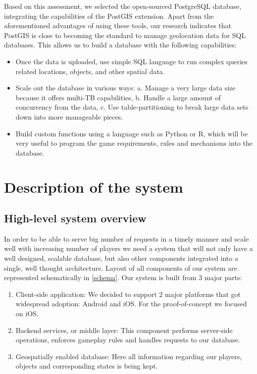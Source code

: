 \documentclass[conference]{IEEEtran}
\begin{document}
Based on this assessment, we selected the open-sourced PostgreSQL database, integrating the capabilities of the PostGIS extension. Apart from the aforementioned advantages of using these tools, our research indicates that PostGIS is close to becoming the standard to manage geolocation data for SQL databases.  This allows us to build a database with the following capabilities:

\begin{itemize}
\item	Once the data is uploaded, use simple SQL language to run complex queries related locations, objects, and other spatial data. 
\item Scale out the database in various ways: a. Manage a very large data size because it offers multi-TB capabilities, b. Handle a large amount of concurrency from the data, c. Use table-partitioning to break large data sets down into more manageable pieces.
\item Build custom functions using a language such as Python or R, which will be very useful to program the game requirements, rules and mechanisms into the database. 
\end{itemize}

\section{Description of the system}

\subsection{High-level system overview}
In order to be able to serve big number of requests in a timely manner and scale well with increasing number of players we need a system that will not only have a well designed, scalable database, but also other components integrated into a single, well thought architecture. Layout of all components of our system are represented schematically in \autoref{schema}.  Our system is built from 3 major parts:

\begin{enumerate}
  \item Client-side application: We decided to support 2 major platforms that got widespread adoption: Android and iOS. For the proof-of-concept we focused on iOS. 
  \item Backend services, or middle layer: This component performs server-side operations, enforces gameplay rules and handles requests to our database. 
  \item Geospatially enabled database: Here all information regarding our players, objects and corresponding states is being kept. 
\end{enumerate}
\end{document}
